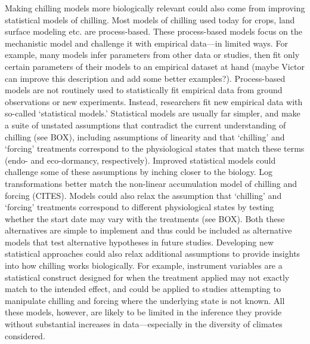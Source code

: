 \documentclass[11pt]{article}
\begin{document}
Making chilling models more biologically relevant could also come from improving statistical models of chilling. Most models of chilling used today for crops, land surface modeling etc. are process-based. These process-based models focus on the mechanistic model and challenge it with empirical data---in limited ways. For example, many models infer parameters from other data or studies, then fit only certain parameters of their models to an empirical dataset at hand \citep{richardson1974} (maybe Victor can improve this description and add some better examples?). Process-based models are not routinely used to statistically fit empirical data from ground observations or new experiments. Instead, researchers fit new empirical data with so-called `statistical models.' Statistical models are usually far simpler, and make a suite of unstated assumptions that contradict the current understanding of chilling (see BOX), including assumptions of linearity and that `chilling' and `forcing' treatments correspond to the physiological states that match these terms (endo- and eco-dormancy, respectively). Improved statistical models could challenge some of these assumptions by inching closer to the biology. Log transformations better match the non-linear accumulation model of chilling and forcing (CITES). Models could also relax the assumption that  `chilling' and `forcing' treatments correspond to different physiological states by testing whether the start date may vary with the treatments (see BOX). Both these alternatives are simple to implement and thus could be included as alternative models that test alternative hypotheses in future studies. Developing new statistical approaches could also relax additional assumptions to provide insights into how chilling works biologically. For example, instrument variables are a statistical construct designed for when the treatment applied may not exactly match to the intended effect, and could be applied to studies attempting to manipulate chilling and forcing where the underlying state is not known. All these models, however, are likely to be limited in the inference they provide without substantial increases in data---especially in the diversity of climates considered. 
\end{document}
